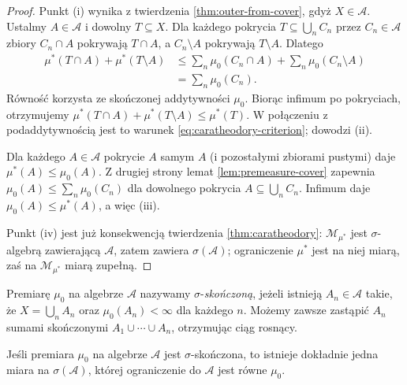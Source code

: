 \begin{proof}
Punkt (i) wynika z twierdzenia \ref{thm:outer-from-cover},
gdyż $X\in\mathcal A$.
Ustalmy $A\in\mathcal A$ i dowolny $T\subseteq X$.
Dla każdego pokrycia $T\subseteq\bigcup_nC_n$ przez
$C_n\in\mathcal A$ zbiory $C_n\cap A$ pokrywają $T\cap A$,
a $C_n\setminus A$ pokrywają $T\setminus A$. Dlatego
\begin{align*}
\mu^*(T\cap A)+\mu^*(T\setminus A)
&\le\sum_n\mu_0(C_n\cap A)+\sum_n\mu_0(C_n\setminus A)\\
&=\sum_n\mu_0(C_n).
\end{align*}
Równość korzysta ze skończonej addytywności $\mu_0$.
Biorąc infimum po pokryciach, otrzymujemy
$\mu^*(T\cap A)+\mu^*(T\setminus A)\le\mu^*(T)$.
W połączeniu z podaddytywnością jest to warunek
\eqref{eq:caratheodory-criterion}; dowodzi (ii).

Dla każdego $A\in\mathcal A$ pokrycie $A$ samym $A$
(i pozostałymi zbiorami pustymi) daje
$\mu^*(A)\le\mu_0(A)$. Z drugiej strony
lemat \ref{lem:premeasure-cover} zapewnia
$\mu_0(A)\le\sum_n\mu_0(C_n)$ dla dowolnego pokrycia
$A\subseteq\bigcup_nC_n$. Infimum daje
$\mu_0(A)\le\mu^*(A)$, a więc (iii).

Punkt (iv) jest już konsekwencją twierdzenia
\ref{thm:caratheodory}: $\mathcal M_{\mu^*}$ jest
$\sigma$-algebrą zawierającą $\mathcal A$, zatem
zawiera $\sigma(\mathcal A)$; ograniczenie $\mu^*$
jest na niej miarą, zaś na $\mathcal M_{\mu^*}$ miarą zupełną.
\end{proof}

\begin{definicja}\label{idx:03:definicja:09}

Premiarę $\mu_0$ na algebrze $\mathcal A$ nazywamy
$\sigma$-\emph{skończoną}, jeżeli istnieją
$A_n\in\mathcal A$ takie, że $X=\bigcup_nA_n$ oraz
$\mu_0(A_n)<\infty$ dla każdego $n$.
Możemy zawsze zastąpić $A_n$ sumami skończonymi
$A_1\cup\cdots\cup A_n$, otrzymując ciąg rosnący.
\end{definicja}

\begin{twierdzenie}
\label{thm:extension-uniqueness}
Jeśli premiara $\mu_0$ na algebrze $\mathcal A$ jest
$\sigma$-skończona, to istnieje dokładnie jedna miara
na $\sigma(\mathcal A)$, której ograniczenie do
$\mathcal A$ jest równe $\mu_0$.
\end{twierdzenie}

